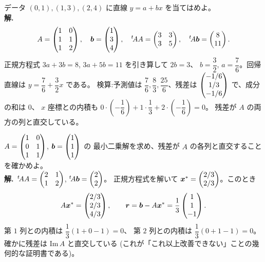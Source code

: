 \begin{rei}[例題・基本(回帰直線)]\label{rei:lsq-line}
データ $(0, 1), (1, 3), (2, 4)$ に直線 $y = a + bx$ を当てはめよ。\\
\textbf{解.}\
\[
A = \begin{pmatrix}1 & 0 \\ 1 & 1 \\ 1 & 2\end{pmatrix}, \quad \bm{b} = \begin{pmatrix}1 \\ 3 \\ 4\end{pmatrix}, \quad
{}^t\!AA = \begin{pmatrix}3 & 3 \\ 3 & 5\end{pmatrix}, \quad {}^t\!A\bm{b} = \begin{pmatrix}8 \\ 11\end{pmatrix}.
\]
正規方程式 $3a + 3b = 8$, $3a + 5b = 11$ を引き算して $2b = 3$、
$b = \dfrac{3}{2}$, $a = \dfrac{7}{6}$。回帰直線は
$y = \dfrac{7}{6} + \dfrac{3}{2}x$ である。
検算:予測値は $\dfrac{7}{6}, \dfrac{8}{3}, \dfrac{25}{6}$、残差は
$\begin{pmatrix}-1/6 \\ 1/3 \\ -1/6\end{pmatrix}$ で、成分の和は $0$、
$x$ 座標との内積も $0 \cdot \left(-\dfrac{1}{6}\right)
+ 1 \cdot \dfrac{1}{3} + 2 \cdot \left(-\dfrac{1}{6}\right) = 0$。
残差が $A$ の両方の列と直交している。
\end{rei}

\begin{rei}[例題・基本(残差の直交性)]\label{rei:lsq-resid}
$A = \begin{pmatrix}1 & 0 \\ 0 & 1 \\ 1 & 1\end{pmatrix}$, $\bm{b} = \begin{pmatrix}1 \\ 1 \\ 1\end{pmatrix}$ の
最小二乗解を求め、残差が $A$ の各列と直交することを確かめよ。\\
\textbf{解.}\
${}^t\!AA = \begin{pmatrix}2 & 1 \\ 1 & 2\end{pmatrix}$, ${}^t\!A\bm{b} = \begin{pmatrix}2 \\ 2\end{pmatrix}$。
正規方程式を解いて $\bm{x}^* = \begin{pmatrix}2/3 \\ 2/3\end{pmatrix}$。このとき
\[
A\bm{x}^* = \begin{pmatrix}2/3 \\ 2/3 \\ 4/3\end{pmatrix}, \qquad
\bm{r} = \bm{b} - A\bm{x}^* = \frac{1}{3}\begin{pmatrix}1 \\ 1 \\ -1\end{pmatrix}.
\]
第 $1$ 列との内積は $\dfrac{1}{3}(1 + 0 - 1) = 0$、
第 $2$ 列との内積は $\dfrac{1}{3}(0 + 1 - 1) = 0$。
確かに残差は $\mathrm{Im}\,A$ と直交している
(これが「これ以上改善できない」ことの幾何的な証明書である)。
\end{rei}

